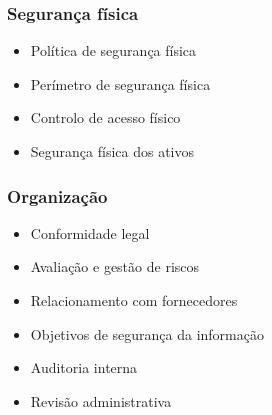 \begin{frame}
  \frametitle{Segurança física}
  \begin{itemize}
    \item Política de segurança física
    \item Perímetro de segurança física
    \item Controlo de acesso físico
    \item Segurança física dos ativos
  \end{itemize}
\end{frame}

\begin{frame}
  \frametitle{Organização}
  \begin{itemize}
    \item Conformidade legal
    \item Avaliação e gestão de riscos
    \item Relacionamento com fornecedores
    \item Objetivos de segurança da informação
    \item Auditoria interna
    \item Revisão administrativa
  \end{itemize}
\end{frame}
